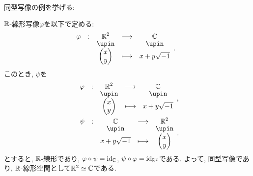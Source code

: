 同型写像の例を挙げる:
\begin{example}
  $\mathbb{R}$-線形写像$\varphi$を以下で定める:
  \begin{align*}
    &\shazo{\varphi}{\RR^2}{\CC}{\begin{pmatrix}x\\y\end{pmatrix}}{x+y\sqrt{-1}}.
  \end{align*}
  このとき,
  $\psi$を
  \begin{align*}
    &\shazo{\varphi}{\RR^2}{\CC}{\begin{pmatrix}x\\y\end{pmatrix}}{x+y\sqrt{-1}},\\
   &\shazo{\psi}{\CC}{\RR^2}{x+y\sqrt{-1}}{\begin{pmatrix}x\\y\end{pmatrix}}.
  \end{align*}
  とすると,
  $\mathbb{R}$-線形であり,
  $\varphi\circ \psi=\operatorname{id}_{\mathbb{C}}$,
  $\psi\circ\varphi=\operatorname{id}_{\mathbb{R}^2}$である.
  よって, 同型写像であり,
  $\mathbb{R}$-線形空間として$\mathbb{R}^2\simeq\mathbb{C}$である.
\end{example}

